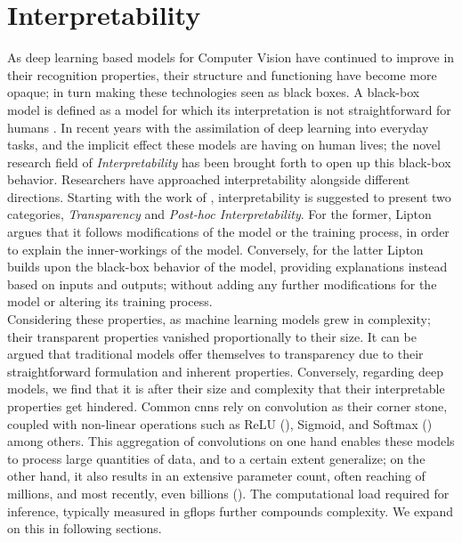 \section{Interpretability}
\label{rel:sec_int}
As deep learning based models for Computer Vision have continued to improve in their recognition 
properties, their structure and functioning have become more opaque; in turn making these 
technologies seen as black boxes. A black-box model is defined as a model for which its 
interpretation is not straightforward for humans \autocite{petch2022opening}. In recent years 
with the assimilation of deep learning into everyday tasks, and the implicit effect these models 
are having on human lives; the novel research field of \emph{Interpretability} has been brought 
forth to open up this black-box behavior. Researchers have approached interpretability alongside 
different directions. Starting with the work of \cite{li2018deep}, interpretability is suggested 
to present two categories, \emph{Transparency} and \emph{Post-hoc Interpretability}.
For the former, Lipton argues that it follows modifications of the model or the training process, 
in order to explain the inner-workings of the model. Conversely, for the latter Lipton builds upon 
the black-box behavior of the model, providing explanations instead based on inputs and outputs; 
without adding any further modifications for the model or altering its training process.\\

\noindent Considering these properties, as machine learning models grew in 
complexity; their transparent properties vanished proportionally to their size. It can be argued 
that traditional models offer themselves to  transparency due to their straightforward formulation 
and inherent properties. Conversely, regarding deep models, we find that it is after their size and 
complexity that their interpretable properties get hindered. Common  \glspl{cnn} 
rely on convolution as their corner stone, coupled with non-linear operations such as 
ReLU (\cite{fukushima1975cognitron}), Sigmoid, and Softmax (\cite{hopfield1985neural}) among others.
This aggregation of convolutions on one hand enables these models to process large quantities of 
data, and to a certain extent generalize; on the other hand, it also results in an extensive 
parameter count, often reaching of millions, and most recently, even billions (\cite{openai_compute}). 
The computational load required for inference, typically measured in \gls{gflops} further compounds 
complexity. We expand on this in following sections.\\

